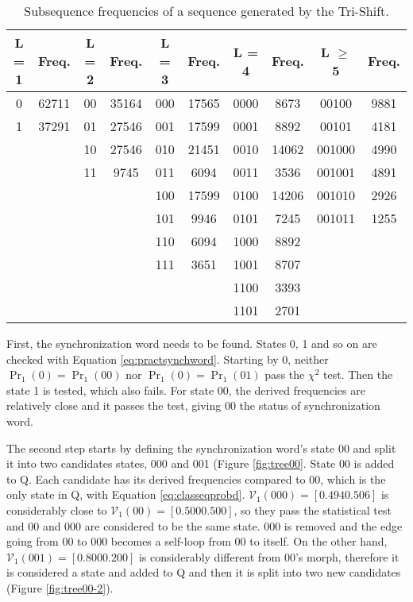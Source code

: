 {\begin{table}
\centering
\caption{Subsequence frequencies of a sequence generated by the Tri-Shift. \label{tab:trishiftsub}}
\begin{tabular}{|c|c|c|c|c|c|c|c|c|c|}
\hline
\textbf{L = 1} & \textbf{Freq.} & \textbf{L = 2} & \textbf{Freq.} & \textbf{L = 3} & \textbf{Freq.} & \textbf{L = 4} & \textbf{Freq.}& \textbf{L $\geq$ 5} & \textbf{Freq.}\\
\hline
0 & 62711 & 00 & 35164 & 000 & 17565 & 0000 & 8673 & 00100 & 9881\\
1 & 37291 & 01 & 27546 & 001 & 17599 & 0001 & 8892 & 00101 & 4181\\
  &      & 10 & 27546 & 010 & 21451 & 0010 & 14062 & 001000 & 4990\\
  &      & 11 & 9745 & 011 & 6094 & 0011 & 3536 & 001001 & 4891\\
  &	     &    &      & 100 & 17599 & 0100 & 14206 & 001010 & 2926\\
  &      &    &      & 101 & 9946 & 0101 & 7245 & 001011 & 1255\\
  &      &    &      & 110 & 6094 & 1000 & 8892 &        &     \\
  &      &    &      & 111 & 3651 & 1001 & 8707 &        &     \\
  &      &    &      &     &      & 1100 & 3393 &        &     \\
  &      &    &      &     &      & 1101 & 2701 &        &     \\
\hline
\end{tabular}
\end{table}

First, the synchronization word needs to be found. States 0, 1 and so on are checked with Equation \ref{eq:practsynchword}. Starting by 0, neither $\Pr_1(0) = \Pr_1(00)$ nor $\Pr_1(0) = \Pr_1(01)$ pass the $\chi^2$ test. Then the state 1 is tested, which also fails. For state 00, the derived frequencies are relatively close and it passes the test, giving 00 the status of synchronization word.

The second step starts by defining the synchronization word's state 00 and split it into two candidates states, 000 and 001 (Figure \ref{fig:tree00}. State 00 is added to Q. Each candidate has its derived frequencies compared to 00, which is the only state in Q, with Equation \ref{eq:classeqprobd}. $\mathcal{V}_1(000) = [0.494 0.506]$ is considerably close to $\mathcal{V}_1(00) = [0.500 0.500]$, so they pass the statistical test and 00 and 000 are considered to be the same state. 000 is removed and the edge going from 00 to 000 becomes a self-loop from 00 to itself. On the other hand, $\mathcal{V}_1(001) = [0.800 0.200]$ is considerably different from 00's morph, therefore it is considered a state and added to Q and then it is split into two new candidates (Figure \ref{fig:tree00-2}).

}

